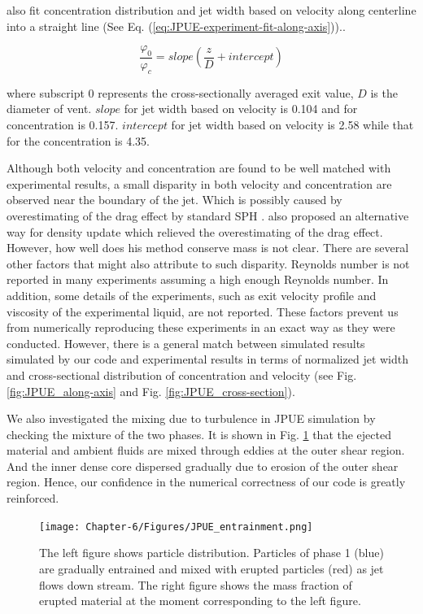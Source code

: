 \citet{papanicolaou1988investigations} also fit concentration distribution and jet width based on velocity along centerline into a straight line (See Eq. (\ref{eq:JPUE-experiment-fit-along-axis})).. 

\begin{equation}
\dfrac{\varphi_0}{\varphi_c}=slope \left(\dfrac{z}{D} + intercept \right)
\label{eq:JPUE-experiment-fit-along-axis}
\end{equation}

where subscript $0$ represents the cross-sectionally averaged exit value, $D$ is the diameter of vent. 
$slope$ for jet width based on velocity is 0.104 and for concentration is 0.157. 
$intercept$ for jet width based on velocity is 2.58 while that for the concentration is 4.35.

Although both velocity and concentration are found to be well matched with experimental results, a small disparity in both velocity and concentration are observed near the boundary of the jet. Which is possibly caused by overestimating of the drag effect by standard SPH \citep {ritchie2001multiphase}. \citet {ritchie2001multiphase} also proposed an alternative way for density update which relieved the overestimating of the drag effect. However, how well does his method conserve mass is not clear. There are several other factors that might also attribute to such disparity. Reynolds number is not reported in many experiments assuming a high enough Reynolds number. In addition, some details of the experiments, such as exit velocity profile and viscosity of the experimental liquid, are not reported. These factors prevent us from numerically reproducing these experiments in an exact way as they were conducted. However, there is a general match between simulated results simulated by our code and experimental results in terms of normalized jet width and cross-sectional distribution of concentration and velocity (see Fig. \ref{fig:JPUE_along-axis} and Fig. \ref{fig:JPUE_cross-section}).

We also investigated the mixing due to turbulence in JPUE simulation by checking the mixture of the two phases. It is shown in Fig. \ref{fig:Turb_mixing} that the ejected material and ambient fluids are mixed through eddies at the outer shear region. And the inner dense core dispersed gradually due to erosion of the outer shear region. Hence, our confidence in the numerical correctness of our code is greatly reinforced.

\begin{figure}
\centering
\texttt{[image: Chapter-6/Figures/JPUE\_entrainment.png]}
\caption{The left figure shows particle distribution. Particles of phase 1 (blue) are gradually entrained and mixed with erupted particles (red) as jet flows down stream. The right figure shows the mass fraction of erupted material at the moment corresponding to the left figure.}
\label{fig:Turb_mixing}
\end{figure}


